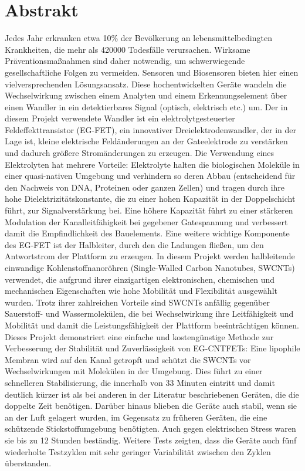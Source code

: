 \chapter*{Abstrakt}

Jedes Jahr erkranken etwa 10\% der Bevölkerung an lebensmittelbedingten Krankheiten, die mehr als \num{420000} Todesfälle verursachen. Wirksame Präventionsmaßnahmen sind daher notwendig, um schwerwiegende gesellschaftliche Folgen zu vermeiden. Sensoren und Biosensoren bieten hier einen vielversprechenden Lösungsansatz. Diese hochentwickelten Geräte wandeln die Wechselwirkung zwischen einem Analyten und einem Erkennungselement über einen Wandler in ein detektierbares Signal (optisch, elektrisch etc.) um. Der in diesem Projekt verwendete Wandler ist ein elektrolytgesteuerter Feldeffekttransistor (EG-FET), ein innovativer Dreielektrodenwandler, der in der Lage ist, kleine elektrische Feldänderungen an der Gateelektrode zu verstärken und dadurch größere Stromänderungen zu erzeugen. Die Verwendung eines Elektrolyten hat mehrere Vorteile: Elektrolyte halten die biologischen Moleküle in einer quasi-nativen Umgebung und verhindern so deren Abbau (entscheidend für den Nachweis von DNA, Proteinen oder ganzen Zellen) und tragen durch ihre hohe Dielektrizitätskonstante, die zu einer hohen Kapazität in der Doppelschicht führt, zur Signalverstärkung bei. Eine höhere Kapazität führt zu einer stärkeren Modulation der Kanalleitfähigkeit bei gegebener Gatespannung und verbessert damit die Empfindlichkeit des Bauelements. Eine weitere wichtige Komponente des EG-FET ist der Halbleiter, durch den die Ladungen fließen, um den Antwortstrom der Plattform zu erzeugen. In diesem Projekt werden halbleitende einwandige Kohlenstoffnanoröhren (Single-Walled Carbon Nanotubes, SWCNTs) verwendet, die aufgrund ihrer einzigartigen elektronischen, chemischen und mechanischen Eigenschaften wie hohe Mobilität und Flexibilität ausgewählt wurden. Trotz ihrer zahlreichen Vorteile sind SWCNTs anfällig gegenüber Sauerstoff- und Wassermolekülen, die bei Wechselwirkung ihre Leitfähigkeit und Mobilität und damit die Leistungsfähigkeit der Plattform beeinträchtigen können. Dieses Projekt demonstriert eine einfache und kostengünstige Methode zur Verbesserung der Stabilität und Zuverlässigkeit von EG-CNTFETs: Eine lipophile Membran wird auf den Kanal getropft und schützt die SWCNTs vor Wechselwirkungen mit Molekülen in der Umgebung. Dies führt zu einer schnelleren Stabilisierung, die innerhalb von 33 Minuten eintritt und damit deutlich kürzer ist als bei anderen in der Literatur beschriebenen Geräten, die die doppelte Zeit benötigen. Darüber hinaus blieben die Geräte auch stabil, wenn sie an der Luft gelagert wurden, im Gegensatz zu früheren Geräten, die eine schützende Stickstoffumgebung benötigten. Auch gegen elektrischen Stress waren sie bis zu 12 Stunden beständig. Weitere Tests zeigten, dass die Geräte auch fünf wiederholte Testzyklen mit sehr geringer Variabilität zwischen den Zyklen überstanden.

